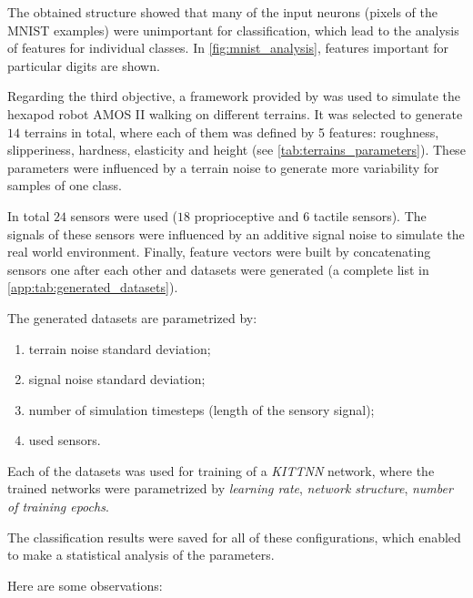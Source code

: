 The obtained structure showed that many of the input neurons (pixels of the MNIST examples) were unimportant for classification, which lead to the analysis of features for individual classes. In \cref{fig:mnist_analysis}, features important for particular digits are shown.

Regarding the third objective, a framework provided by \citep{misc:lpzrobots} was used to simulate the hexapod robot AMOS II walking on different terrains. It was selected to generate $ 14 $ terrains in total, where each of them was defined by 5 features: roughness, slipperiness, hardness, elasticity and height (see \cref{tab:terrains_parameters}). These parameters were influenced by a terrain noise to generate more variability for samples of one class.

In total $ 24 $ sensors were used ($ 18 $ proprioceptive and $ 6 $ tactile sensors). The signals of these sensors were influenced by an additive signal noise to simulate the real world environment. Finally, feature vectors were built by concatenating sensors one after each other and datasets were generated (a complete list in \cref{app:tab:generated_datasets}).

The generated datasets are parametrized by:

\begin{enumerate}
\item terrain noise standard deviation;
\item signal noise standard deviation;
\item number of simulation timesteps (length of the sensory signal);
\item used sensors.
\end{enumerate}

Each of the datasets was used for training of a \textit{KITTNN} network, where the trained networks were parametrized by \textit{learning rate}, \textit{network structure}, \textit{number of training epochs}.

The classification results were saved for all of these configurations, which enabled to make a statistical analysis of the parameters. 

Here are some observations:

